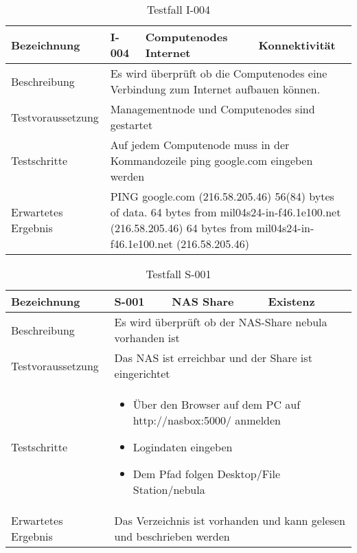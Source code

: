 \begin{table}[H]
\centering
\begin{tabular}{|p{4cm}|p{4cm}|p{4cm}|p{4cm}|}
\hline
Bezeichnung & \textbf{I-004} & Computenodes Internet & Konnektivität \\\hline
Beschreibung & \multicolumn{3}{p{12cm}|}{Es wird überprüft ob die Computenodes eine Verbindung zum Internet aufbauen können.} \\\hline
Testvoraussetzung & \multicolumn{3}{p{12cm}|}{Managementnode und Computenodes sind gestartet} \\\hline
Testschritte & \multicolumn{3}{p{12cm}|}{Auf jedem Computenode muss in der Kommandozeile ping google.com eingeben werden} \\\hline
Erwartetes Ergebnis & \multicolumn{3}{p{12cm}|}{PING google.com (216.58.205.46) 56(84) bytes of data.
64 bytes from mil04s24-in-f46.1e100.net (216.58.205.46)
64 bytes from mil04s24-in-f46.1e100.net (216.58.205.46)}\\\hline
\end{tabular}
\caption{Testfall I-004}
\label{Testfall I-004}
\end{table}

\begin{table}[H]
\centering
\begin{tabular}{|p{4cm}|p{4cm}|p{4cm}|p{4cm}|}
\hline
Bezeichnung & \textbf{S-001} & NAS Share & Existenz \\\hline
Beschreibung & \multicolumn{3}{p{12cm}|}{Es wird überprüft ob der NAS-Share nebula vorhanden ist} \\\hline
Testvoraussetzung & \multicolumn{3}{p{12cm}|}{Das NAS ist erreichbar und der Share ist eingerichtet} \\\hline
Testschritte & \multicolumn{3}{p{12cm}|}{\begin{itemize}
\item Über den Browser auf dem PC auf http://nasbox:5000/ anmelden
\item Logindaten eingeben
\item Dem Pfad folgen Desktop/File Station/nebula
\end{itemize}} \\ \hline
Erwartetes Ergebnis & \multicolumn{3}{p{12cm}|}{Das Verzeichnis ist vorhanden und kann gelesen und beschrieben werden}\\\hline
\end{tabular}
\caption{Testfall S-001}
\label{Testfall S-001}
\end{table}

